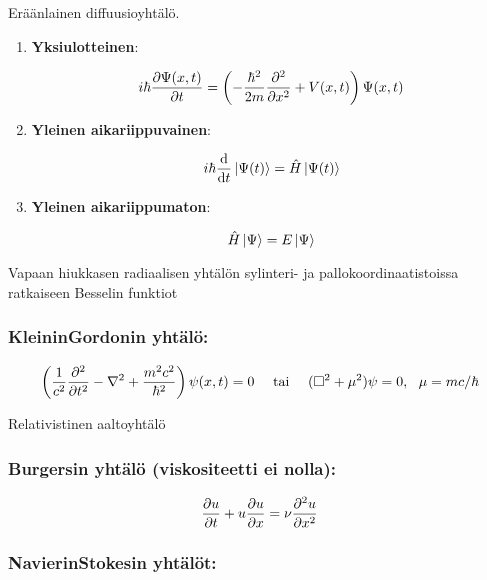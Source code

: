 \documentclass[../johdoksia.tex]{subfiles}
\begin{document}
	Eräänlainen diffuusioyhtälö.
	
	\begin{enumerate}
		\item \textbf{Yksiulotteinen}:
		
		\begin{equation}
			i\hbar\pdv{\Psi(x, t)}{t} = \left(-\frac{\hbar^2}{2m}\pdv{^2}{x^2} + V(x, t)\right)\Psi(x, t)
		\end{equation}
		
		\item \textbf{Yleinen aikariippuvainen}:
		
		\begin{equation}
			i\hbar\odv{}{t}\ket{\Psi(t)} = \hat{H}\ket{\Psi(t)}
		\end{equation}
		
		\item \textbf{Yleinen aikariippumaton}:
		
		\begin{equation}
			\hat{H}\ket{\Psi} = E\ket{\Psi}
		\end{equation}
		
	\end{enumerate}

	Vapaan hiukkasen radiaalisen yhtälön sylinteri- ja pallokoordinaatistoissa ratkaiseen Besselin funktiot
	
	\subsubsection{Kleinin\textendash Gordonin yhtälö:}
	
	\begin{equation}
		\left(\frac{1}{c^2}\pdv{^2}{t^2} - \nabla^2 + \frac{m^2c^2}{\hbar^2}\right)\psi(x, t) = 0 \ \ \ \ \text{tai} \ \ \ \ (\square^2 + \mu^2)\psi = 0, \ \ \mu = mc/\hbar
	\end{equation}

	Relativistinen aaltoyhtälö
	
	\subsubsection{Burgersin yhtälö (viskositeetti ei nolla):}
	
	\begin{equation}
		\pdv{u}{t} + u\pdv{u}{x} = \nu\pdv{^2u}{x^2}
	\end{equation}
	
	\subsubsection{Navierin\textendash Stokesin yhtälöt:}
	
\end{document}
